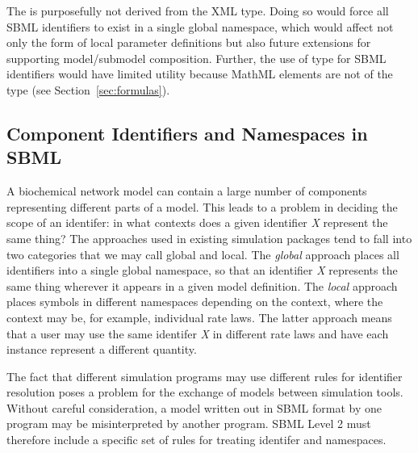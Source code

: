 \documentclass[10pt,twocolumntoc]{cekarticle}
\begin{document}
The  is purposefully not derived from the XML  type.
Doing so would force all SBML identifiers to exist in a single global
namespace, which would affect not only the form of local parameter
definitions but also future extensions for supporting model/submodel
composition.  Further, the use of  type for SBML identifiers
would have limited utility because MathML  elements are not of
the type  (see Section~\ref{sec:formulas}).


\subsection{Component Identifiers and Namespaces in SBML}
\label{sec:namespaces}

A biochemical network model can contain a large number of
components representing different parts of a model.  This leads to
a problem in deciding the scope of an identifer: in what contexts
does a given identifier \emph{X} represent the same thing?  The
approaches used in existing simulation packages tend to fall into
two categories that we may call global and local.  The
\emph{global} approach places all identifiers into a single global
namespace, so that an identifier \emph{X} represents the same thing
wherever it appears in a given model definition.  The \emph{local}
approach places symbols in different namespaces depending on the
context, where the context may be, for example, individual rate
laws.  The latter approach means that a user may use the same
identifer \emph{X} in different rate laws and have each instance
represent a different quantity.

The fact that different simulation programs may use different
rules for identifier resolution poses a problem for the exchange
of models between simulation tools.  Without careful
consideration, a model written out in SBML format by one program
may be misinterpreted by another program.  SBML Level 2 must
therefore include a specific set of rules for treating identifer
and namespaces.
\end{document}
